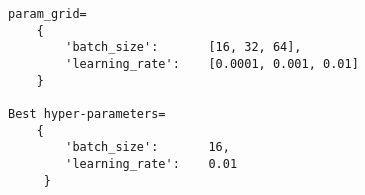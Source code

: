 \begin{lstlisting}
param_grid=
    {
        'batch_size':       [16, 32, 64],
        'learning_rate':    [0.0001, 0.001, 0.01]
    }

Best hyper-parameters=
    {
        'batch_size':       16, 
        'learning_rate':    0.01
     }
\end{lstlisting}